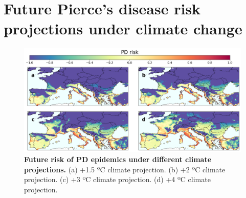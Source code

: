 \section{Future Pierce’s disease risk projections under climate change}

\begin{figure}[H]
    \centering
    \includegraphics[width=\textwidth]{Figures/Future_risk_vector.pdf}
    \caption{\textbf{Future risk of PD epidemics under different climate
            projections.} (a) +1.5 ºC climate projection. (b) +2 ºC climate
        projection. (c)
        +3 ºC climate projection. (d) +4 ºC climate projection.}
    \label{fig:PD_future_risk}
\end{figure}

\begin{table}[H]
    \centering
    \caption{Some risk velocity statistics for each climate projection.}
    \label{tab:risk_vel}
\end{table}

